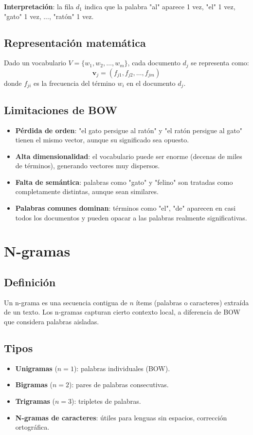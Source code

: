 \documentclass[12pt,a4paper,openany,oneside]{book}
\begin{document}
\textbf{Interpretación}: la fila \(d_1\) indica que la palabra "al" aparece 1 vez, "el" 1 vez, "gato" 1 vez, ..., "ratón" 1 vez.

\subsection{Representación matemática}
Dado un vocabulario \(V = \{w_1, w_2, \dots, w_m\}\), cada documento \(d_j\) se representa como:
\[
\mathbf{v}_j = (f_{j1}, f_{j2}, \dots, f_{jm})
\]
donde \(f_{ji}\) es la frecuencia del término \(w_i\) en el documento \(d_j\).

\subsection{Limitaciones de BOW}
\begin{itemize}
    \item \textbf{Pérdida de orden}: "el gato persigue al ratón" y "el ratón persigue al gato" tienen el mismo vector, aunque su significado sea opuesto.
    \item \textbf{Alta dimensionalidad}: el vocabulario puede ser enorme (decenas de miles de términos), generando vectores muy dispersos.
    \item \textbf{Falta de semántica}: palabras como "gato" y "felino" son tratadas como completamente distintas, aunque sean similares.
    \item \textbf{Palabras comunes dominan}: términos como "el", "de" aparecen en casi todos los documentos y pueden opacar a las palabras realmente significativas.
\end{itemize}

\section{N-gramas}

\subsection{Definición}
Un n-grama es una secuencia contigua de \(n\) ítems (palabras o caracteres) extraída de un texto. Los n-gramas capturan cierto contexto local, a diferencia de BOW que considera palabras aisladas.

\subsection{Tipos}
\begin{itemize}
    \item \textbf{Unigramas} (\(n=1\)): palabras individuales (BOW).
    \item \textbf{Bigramas} (\(n=2\)): pares de palabras consecutivas.
    \item \textbf{Trigramas} (\(n=3\)): tripletes de palabras.
    \item \textbf{N-gramas de caracteres}: útiles para lenguas sin espacios, corrección ortográfica.
\end{itemize}
\end{document}
